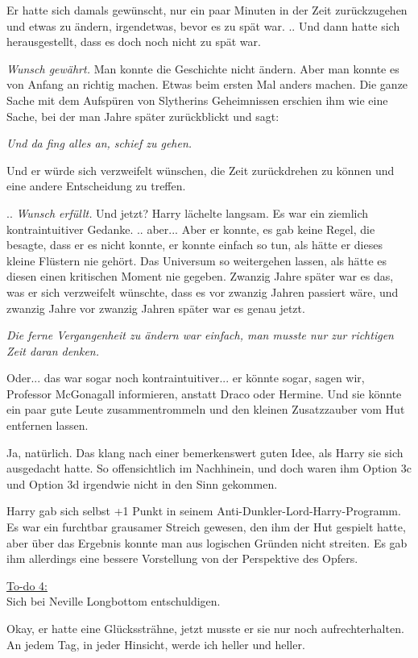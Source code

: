 Er hatte sich damals gewünscht, nur ein paar Minuten in der Zeit zurückzugehen
und etwas zu ändern, irgendetwas, bevor es zu spät war. .. Und dann hatte sich
herausgestellt, dass es doch noch nicht zu spät war.

\emph{Wunsch gewährt.} Man konnte die Geschichte nicht ändern. Aber man konnte
es von Anfang an richtig machen. Etwas beim ersten Mal anders machen. Die ganze
Sache mit dem Aufspüren von Slytherins Geheimnissen erschien ihm wie eine Sache,
bei der man Jahre später zurückblickt und sagt:

\emph{Und da fing alles an, schief zu gehen.}

Und er würde sich verzweifelt wünschen, die Zeit zurückdrehen zu können und eine
andere Entscheidung zu treffen.

.. \emph{Wunsch erfüllt.} Und jetzt? Harry lächelte langsam. Es war ein ziemlich
kontraintuitiver Gedanke. .. aber... Aber er konnte, es gab keine Regel, die
besagte, dass er es nicht konnte, er konnte einfach so tun, als hätte er dieses
kleine Flüstern nie gehört. Das Universum so weitergehen lassen, als hätte es
diesen einen kritischen Moment nie gegeben. Zwanzig Jahre später war es das, was
er sich verzweifelt wünschte, dass es vor zwanzig Jahren passiert wäre, und
zwanzig Jahre vor zwanzig Jahren später war es genau jetzt.

\emph{Die ferne Vergangenheit zu ändern war einfach, man musste nur zur
richtigen Zeit daran denken. }

Oder... das war sogar noch kontraintuitiver... er könnte sogar, sagen wir,
Professor McGonagall informieren, anstatt Draco oder Hermine. Und sie könnte ein
paar gute Leute zusammentrommeln und den kleinen Zusatzzauber vom Hut entfernen
lassen.

Ja, natürlich. Das klang nach einer bemerkenswert guten Idee, als Harry sie sich
ausgedacht hatte. So offensichtlich im Nachhinein, und doch waren ihm Option 3c
und Option 3d irgendwie nicht in den Sinn gekommen.

Harry gab sich selbst +1 Punkt in seinem Anti-Dunkler-Lord-Harry-Programm. Es
war ein furchtbar grausamer Streich gewesen, den ihm der Hut gespielt hatte,
aber über das Ergebnis konnte man aus logischen Gründen nicht streiten. Es gab
ihm allerdings eine bessere Vorstellung von der Perspektive des Opfers.

\underline{To-do 4:}\\
Sich bei Neville Longbottom entschuldigen.

Okay, er hatte eine Glückssträhne, jetzt musste er sie nur noch
aufrechterhalten. An jedem Tag, in jeder Hinsicht, werde ich heller und heller.

